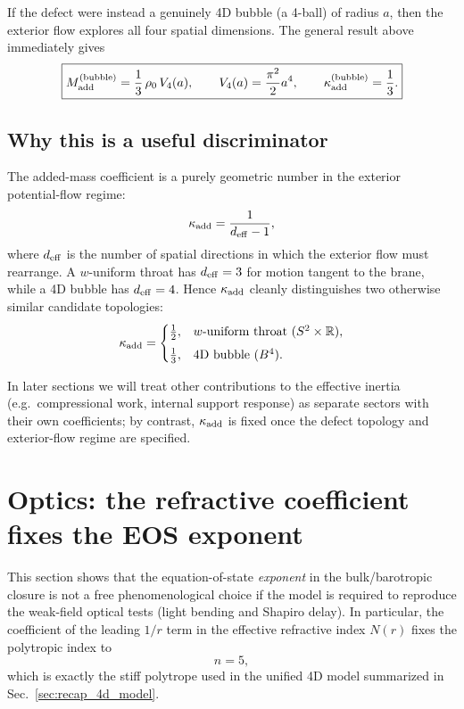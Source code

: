 \documentclass[11pt]{article}
\begin{document}
If the defect were instead a genuinely 4D bubble (a 4-ball) of radius \(a\), then the exterior flow explores all four spatial dimensions. The general result above immediately gives
\begin{equation}
  \boxed{
  M_{\rm add}^{\rm(bubble)}
  = \frac13\,\rho_0\,V_4(a),
  \qquad
  V_4(a)=\frac{\pi^2}{2}a^4,
  \qquad
  \kappa_{\rm add}^{\rm(bubble)}=\frac13.
  }
\end{equation}

\subsection{Why this is a useful discriminator}

The added-mass coefficient is a purely geometric number in the exterior potential-flow regime:
\begin{equation}
  \kappa_{\rm add}=\frac{1}{d_{\rm eff}-1},
\end{equation}
where \(d_{\rm eff}\) is the number of spatial directions in which the exterior flow must rearrange.
A \(w\)-uniform throat has \(d_{\rm eff}=3\) for motion tangent to the brane, while a 4D bubble has \(d_{\rm eff}=4\).
Hence \(\kappa_{\rm add}\) cleanly distinguishes two otherwise similar candidate topologies:
\begin{equation}
  \kappa_{\rm add}=
  \begin{cases}
    \tfrac12, & \text{\(w\)-uniform throat } (S^2\times\mathbb R),\\[4pt]
    \tfrac13, & \text{4D bubble } (B^4).
  \end{cases}
\end{equation}

In later sections we will treat other contributions to the effective inertia (e.g.\ compressional work, internal support response) as separate sectors with their own coefficients; by contrast, \(\kappa_{\rm add}\) is fixed once the defect topology and exterior-flow regime are specified.

\section{Optics: the refractive coefficient fixes the EOS exponent}
\label{sec:optics_eos}

This section shows that the equation-of-state \emph{exponent} in the bulk/barotropic closure is not a free phenomenological choice if the model is required to reproduce the weak-field optical tests (light bending and Shapiro delay). In particular, the coefficient of the leading $1/r$ term in the effective refractive index $N(r)$ fixes the polytropic index to
\begin{equation}
n=5,
\end{equation}
which is exactly the stiff polytrope used in the unified 4D model summarized in Sec.~\ref{sec:recap_4d_model}. 
\end{document}

